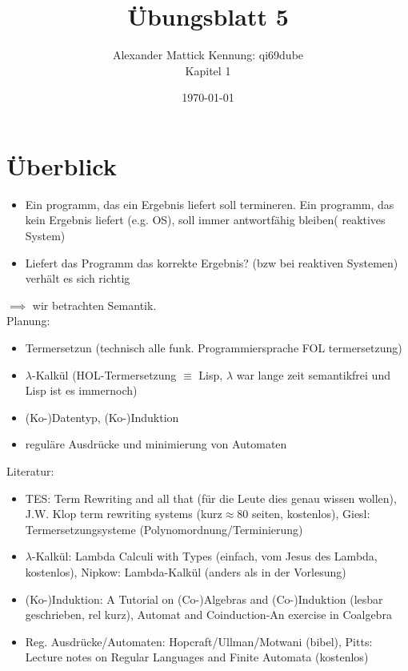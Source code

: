 \documentclass{article}
\title{Übungsblatt 5}
\author{
Alexander Mattick Kennung: qi69dube\\
Kapitel 1
}
\date{\today}
\begin{document}
	\maketitle
	\section{Überblick}
	\begin{itemize}[noitemsep,topsep=0pt]
	\item Ein programm, das ein Ergebnis liefert soll termineren. Ein programm, das kein Ergebnis liefert (e.g. OS), soll immer antwortfähig bleiben( reaktives System)
	\item Liefert das Programm das korrekte Ergebnis? (bzw bei reaktiven Systemen) verhält es sich richtig
	\end{itemize}
	$\implies$ wir betrachten Semantik.\\
	Planung:
	\begin{itemize}[noitemsep,topsep=0pt]
		\item Termersetzun (technisch alle funk. Programmiersprache FOL termersetzung)
		\item $\lambda$-Kalkül (HOL-Termersetzung $\equiv$ Lisp, $\lambda$ war lange zeit semantikfrei und Lisp ist es immernoch) 
		\item (Ko-)Datentyp, (Ko-)Induktion
		\item reguläre Ausdrücke und minimierung von Automaten
	\end{itemize}
	Literatur:
	\begin{itemize}[noitemsep,topsep=0pt]
		\item TES: Term Rewriting and all that (für die Leute dies genau wissen wollen), J.W. Klop term rewriting systems (kurz$\approx 80$ seiten, kostenlos), Giesl: Termersetzungsysteme (Polynomordnung/Terminierung)
		\item $\lambda$-Kalkül: Lambda Calculi with Types (einfach, vom Jesus des Lambda, kostenlos), Nipkow: Lambda-Kalkül (anders als in der Vorlesung)
		\item (Ko-)Induktion: A Tutorial on (Co-)Algebras and (Co-)Induktion (lesbar geschrieben, rel kurz), Automat and Coinduction-An exercise in Coalgebra
		\item Reg. Ausdrücke/Automaten: Hopcraft/Ullman/Motwani (bibel), Pitts: Lecture notes on Regular Languages and Finite Automata (kostenlos)
	\end{itemize}
\end{document}
